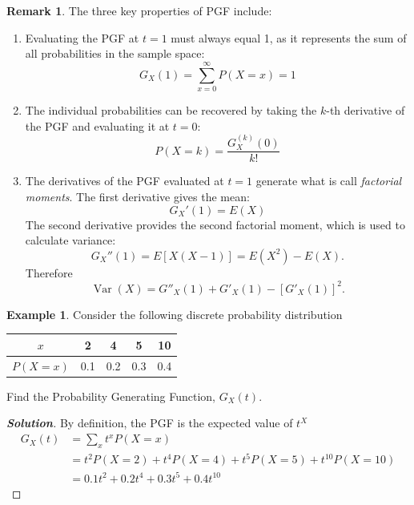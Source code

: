 \documentclass[12pt,a4paper]{report}
\theoremstyle{definition}
\newtheorem{example}[thm]{Example}
\newtheorem{remark}[thm]{Remark}
\theoremstyle{plain}
\theoremstyle{definition}
\begin{document}
\begin{remark}
The three key properties of PGF include:
\begin{enumerate}
\item  Evaluating the PGF at $t=1$ must always equal 1, as it represents the sum of all probabilities in the sample space:\[G_X(1) = \sum_{x=0}^{\infty} P(X=x) = 1\]
\item The individual probabilities can be recovered by taking the $k$-th derivative of the PGF and evaluating it at $t=0$:
\[P(X=k) = \frac{G_X^{(k)}(0)}{k!}\]

\item The derivatives of the PGF evaluated at $t=1$ generate what is call \textit{factorial moments}. The first derivative gives the mean:
\[G_X'(1) = E(X)\]
The second derivative provides the second factorial moment, which is used to calculate variance:
\[G_X''(1) = E[X(X - 1)] = E(X^2) - E(X).\]
Therefore \[\operatorname{Var}(X) = G''_X(1) + G'_X(1) - [G'_X(1)]^2.\]
\end{enumerate}
\end{remark}







\begin{example}
Consider the following discrete probability distribution
\begin{table}[H]
\centering
\begin{tabular}{|c|c|c|c|c|}
\hline
$x$ & 2 & 4 & 5 & 10 \\ 
\hline
$P(X=x)$ & 0.1 & 0.2 & 0.3 & 0.4 \\ 
\hline
\end{tabular}
\end{table}
Find the Probability Generating Function, $G_X(t)$.
\end{example}

\begin{proof}[\textbf{\textit{Solution}}]
By definition, the PGF is the expected value of $t^X$
\begin{align*}
G_X(t) & = \sum_{x} t^x P(X=x) \\
& = t^2 P(X=2) + t^4 P(X=4) + t^5 P(X=5) + t^{10} P(X=10) \\
&= 0.1t^2 + 0.2t^4 + 0.3t^5 + 0.4t^{10}
\end{align*}
\end{proof}
\end{document}
